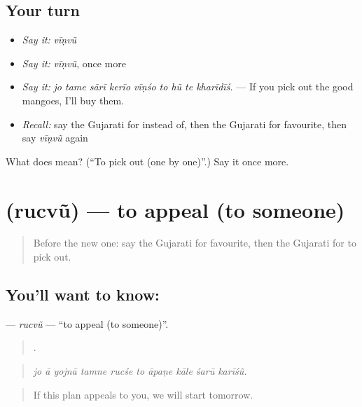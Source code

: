 \subsection*{Your turn}
\begin{itemize}
\raggedright
  \item \emph{Say it:} \emph{vīṇvũ}
  \item \emph{Say it:} \emph{vīṇvũ}, once more
  \item \emph{Say it:} \emph{jo tame sārī kerīo vīṇśo to hũ te kharīdīś.} — If you pick out the good mangoes, I'll buy them.
  \item \emph{Recall:} say the Gujarati for instead of, then the Gujarati for favourite, then say \emph{vīṇvũ} again
\end{itemize}

\begin{tcolorbox}[breakable,colback=teal!4,colframe=teal!35!black,title={Before you move on}]
What does  mean? (\textquotedblleft{}To pick out (one by one)\textquotedblright{}.) Say it once more.
\end{tcolorbox}
\section[\texorpdfstring{\gu{રુચવું} (rucvũ)}{રુચવું (rucvũ)}]{ (rucvũ) — to appeal (to someone)}

\label{lesson:GU-C537-rucvu}



\begin{quote}
Before the new one: say the Gujarati for favourite, then the Gujarati for to pick out.
\end{quote}

\subsection*{You'll want to know: }
\textbf{} — \emph{rucvũ} — \textquotedblleft{}to appeal (to someone)\textquotedblright{}.

\begin{quote}
         .
\end{quote}

\begin{quote}
\emph{jo ā yojnā tamne rucśe to āpaṇe kāle śarū karīśũ.}
\end{quote}

\begin{quote}
If this plan appeals to you, we will start tomorrow.
\end{quote}

